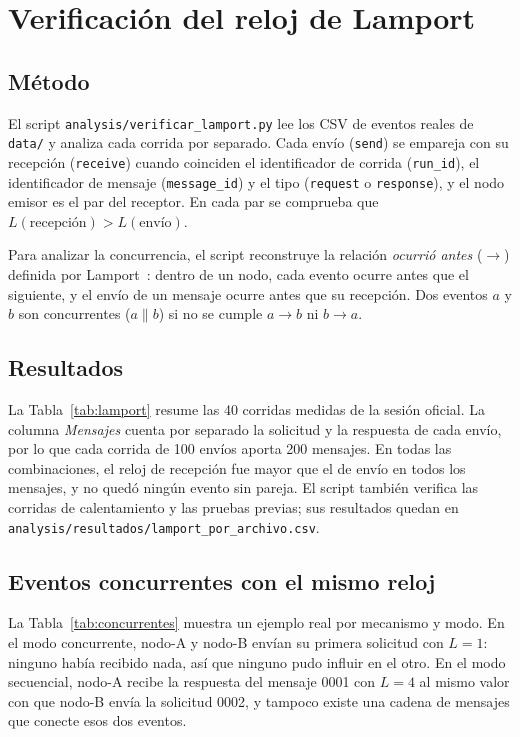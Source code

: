 \section{Verificación del reloj de Lamport}


\subsection{Método}
El script \texttt{analysis/verificar\_lamport.py} lee los CSV de eventos reales
de \texttt{data/} y analiza cada corrida por separado. Cada envío
(\texttt{send}) se empareja con su recepción (\texttt{receive}) cuando
coinciden el identificador de corrida (\texttt{run\_id}), el identificador de
mensaje (\texttt{message\_id}) y el tipo (\texttt{request} o
\texttt{response}), y el nodo emisor es el par del receptor. En cada par se
comprueba que $L(\text{recepción}) > L(\text{envío})$.

Para analizar la concurrencia, el script reconstruye la relación
\emph{ocurrió antes} ($\rightarrow$) definida por Lamport~\cite{lamport1978}:
dentro de un nodo, cada evento ocurre antes que el siguiente, y el envío de un
mensaje ocurre antes que su recepción. Dos eventos $a$ y $b$ son concurrentes
($a \parallel b$) si no se cumple $a \rightarrow b$ ni $b \rightarrow a$.

\subsection{Resultados}
La Tabla~\ref{tab:lamport} resume las 40 corridas medidas de la sesión
oficial. La columna \emph{Mensajes} cuenta por separado la solicitud y la
respuesta de cada envío, por lo que cada corrida de 100 envíos aporta 200
mensajes. En todas las combinaciones, el reloj de recepción fue mayor que el
de envío en todos los mensajes, y no quedó ningún evento sin pareja. El script
también verifica las corridas de calentamiento y las pruebas previas; sus
resultados quedan en \texttt{analysis/resultados/lamport\_por\_archivo.csv}.

\begin{table}[ht]
\centering
\caption{Verificación de Lamport en la sesión oficial (generada por el script).
\emph{Iguales y conc.}: pares de eventos de nodos distintos con el mismo reloj
que son concurrentes.}
\label{tab:lamport}
\resizebox{\textwidth}{!}{}
\end{table}

\subsection{Eventos concurrentes con el mismo reloj}
La Tabla~\ref{tab:concurrentes} muestra un ejemplo real por mecanismo y modo.
En el modo concurrente, nodo-A y nodo-B envían su primera solicitud con
$L=1$: ninguno había recibido nada, así que ninguno pudo influir en el otro.
En el modo secuencial, nodo-A recibe la respuesta del mensaje 0001 con $L=4$
al mismo valor con que nodo-B envía la solicitud 0002, y tampoco existe una
cadena de mensajes que conecte esos dos eventos.

